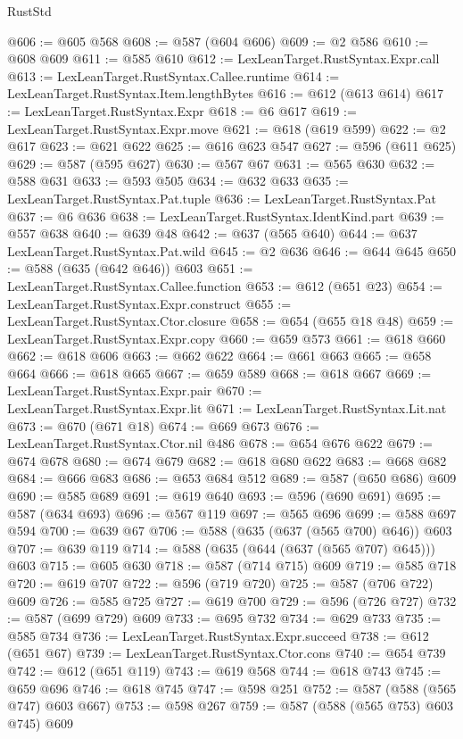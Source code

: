 \begin{lexlean}{RustStd}
\begin{coremodule}
@606 := @605 @568
@608 := @587 (@604 @606)
@609 := @2 @586
@610 := @608 @609
@611 := @585 @610
@612 := LexLeanTarget.RustSyntax.Expr.call
@613 := LexLeanTarget.RustSyntax.Callee.runtime
@614 := LexLeanTarget.RustSyntax.Item.lengthBytes
@616 := @612 (@613 @614)
@617 := LexLeanTarget.RustSyntax.Expr
@618 := @6 @617
@619 := LexLeanTarget.RustSyntax.Expr.move
@621 := @618 (@619 @599)
@622 := @2 @617
@623 := @621 @622
@625 := @616 @623 @547
@627 := @596 (@611 @625)
@629 := @587 (@595 @627)
@630 := @567 @67
@631 := @565 @630
@632 := @588 @631
@633 := @593 @505
@634 := @632 @633
@635 := LexLeanTarget.RustSyntax.Pat.tuple
@636 := LexLeanTarget.RustSyntax.Pat
@637 := @6 @636
@638 := LexLeanTarget.RustSyntax.IdentKind.part
@639 := @557 @638
@640 := @639 @48
@642 := @637 (@565 @640)
@644 := @637 LexLeanTarget.RustSyntax.Pat.wild
@645 := @2 @636
@646 := @644 @645
@650 := @588 (@635 (@642 @646)) @603
@651 := LexLeanTarget.RustSyntax.Callee.function
@653 := @612 (@651 @23)
@654 := LexLeanTarget.RustSyntax.Expr.construct
@655 := LexLeanTarget.RustSyntax.Ctor.closure
@658 := @654 (@655 @18 @48)
@659 := LexLeanTarget.RustSyntax.Expr.copy
@660 := @659 @573
@661 := @618 @660
@662 := @618 @606
@663 := @662 @622
@664 := @661 @663
@665 := @658 @664
@666 := @618 @665
@667 := @659 @589
@668 := @618 @667
@669 := LexLeanTarget.RustSyntax.Expr.pair
@670 := LexLeanTarget.RustSyntax.Expr.lit
@671 := LexLeanTarget.RustSyntax.Lit.nat
@673 := @670 (@671 @18)
@674 := @669 @673
@676 := LexLeanTarget.RustSyntax.Ctor.nil @486
@678 := @654 @676 @622
@679 := @674 @678
@680 := @674 @679
@682 := @618 @680 @622
@683 := @668 @682
@684 := @666 @683
@686 := @653 @684 @512
@689 := @587 (@650 @686) @609
@690 := @585 @689
@691 := @619 @640
@693 := @596 (@690 @691)
@695 := @587 (@634 @693)
@696 := @567 @119
@697 := @565 @696
@699 := @588 @697 @594
@700 := @639 @67
@706 := @588 (@635 (@637 (@565 @700) @646)) @603
@707 := @639 @119
@714 := @588 (@635 (@644 (@637 (@565 @707) @645))) @603
@715 := @605 @630
@718 := @587 (@714 @715) @609
@719 := @585 @718
@720 := @619 @707
@722 := @596 (@719 @720)
@725 := @587 (@706 @722) @609
@726 := @585 @725
@727 := @619 @700
@729 := @596 (@726 @727)
@732 := @587 (@699 @729) @609
@733 := @695 @732
@734 := @629 @733
@735 := @585 @734
@736 := LexLeanTarget.RustSyntax.Expr.succeed
@738 := @612 (@651 @67)
@739 := LexLeanTarget.RustSyntax.Ctor.cons
@740 := @654 @739
@742 := @612 (@651 @119)
@743 := @619 @568
@744 := @618 @743
@745 := @659 @696
@746 := @618 @745
@747 := @598 @251
@752 := @587 (@588 (@565 @747) @603 @667)
@753 := @598 @267
@759 := @587 (@588 (@565 @753) @603 @745) @609

\end{coremodule}
\end{lexlean}
